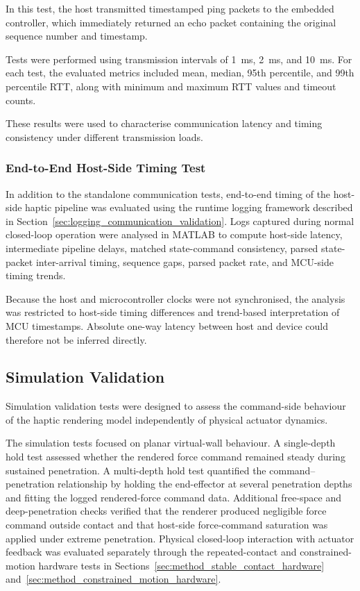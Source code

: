 In this test, the host transmitted timestamped ping packets to the embedded controller, which immediately returned an echo packet containing the original sequence number and timestamp.

Tests were performed using transmission intervals of 1~ms, 2~ms, and 10~ms. For each test, the evaluated metrics included mean, median, 95th percentile, and 99th percentile RTT, along with minimum and maximum RTT values and timeout counts.

These results were used to characterise communication latency and timing consistency under different transmission loads.

\subsubsection{End-to-End Host-Side Timing Test}

In addition to the standalone communication tests, end-to-end timing of the host-side haptic pipeline was evaluated using the runtime logging framework described in Section~\ref{sec:logging_communication_validation}. Logs captured during normal closed-loop operation were analysed in MATLAB to compute host-side latency, intermediate pipeline delays, matched state-command consistency, parsed state-packet inter-arrival timing, sequence gaps, parsed packet rate, and MCU-side timing trends.

Because the host and microcontroller clocks were not synchronised, the analysis was restricted to host-side timing differences and trend-based interpretation of MCU timestamps. Absolute one-way latency between host and device could therefore not be inferred directly.

\subsection{Simulation Validation} \label{sec:method_simulation}

Simulation validation tests were designed to assess the command-side behaviour of the haptic rendering model independently of physical actuator dynamics.

The simulation tests focused on planar virtual-wall behaviour. A single-depth hold test assessed whether the rendered force command remained steady during sustained penetration. A multi-depth hold test quantified the command--penetration relationship by holding the end-effector at several penetration depths and fitting the logged rendered-force command data. Additional free-space and deep-penetration checks verified that the renderer produced negligible force command outside contact and that host-side force-command saturation was applied under extreme penetration. Physical closed-loop interaction with actuator feedback was evaluated separately through the repeated-contact and constrained-motion hardware tests in Sections~\ref{sec:method_stable_contact_hardware} and~\ref{sec:method_constrained_motion_hardware}.

